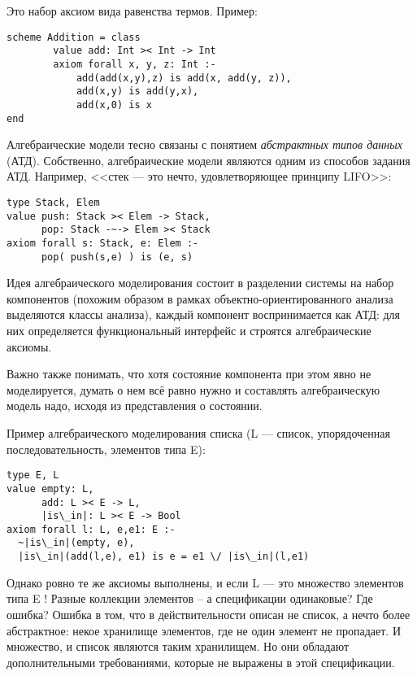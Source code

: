 Это набор аксиом вида равенства термов. Пример:
\begin{lstlisting}
scheme Addition = class
        value add: Int >< Int -> Int
        axiom forall x, y, z: Int :-
            add(add(x,y),z) is add(x, add(y, z)),
            add(x,y) is add(y,x),
            add(x,0) is x
end
\end{lstlisting}

Алгебраические модели тесно связаны с понятием \emph{абстрактных типов данных} (АТД). Собственно, алгебраические модели являются одним из способов задания АТД. Например, <<стек --- это нечто, удовлетворяющее принципу LIFO>>:
\begin{lstlisting}
type Stack, Elem
value push: Stack >< Elem -> Stack,
      pop: Stack -~-> Elem >< Stack
axiom forall s: Stack, e: Elem :-
      pop( push(s,e) ) is (e, s)
\end{lstlisting}

Идея алгебраического моделирования состоит в разделении системы на набор компонентов (похожим образом в рамках объектно-ориентированного анализа выделяются классы анализа), каждый компонент воспринимается как АТД: для них определяется функциональный интерфейс и строятся алгебраические аксиомы.

Важно также понимать, что хотя состояние компонента при этом явно не моделируется, думать о нем всё равно нужно и составлять алгебраическую модель надо, исходя из представления о состоянии.

Пример алгебраического моделирования списка (L --- список, упорядоченная последовательность, элементов типа E):
\begin{lstlisting}[escapechar={|}]
type E, L
value empty: L,
      add: L >< E -> L,
      |is\_in|: L >< E -> Bool
axiom forall l: L, e,e1: E :-
  ~|is\_in|(empty, e),
  |is\_in|(add(l,e), e1) is e = e1 \/ |is\_in|(l,e1)
\end{lstlisting}

Однако ровно те же аксиомы выполнены, и если L --- это множество элементов типа E ! Разные коллекции элементов -- а спецификации одинаковые? Где ошибка? Ошибка в том, что в действительности описан не список, а нечто более абстрактное: некое хранилище элементов, где не один элемент не пропадает. И множество, и список являются таким хранилищем. Но они обладают дополнительными требованиями, которые не выражены в этой спецификации.


